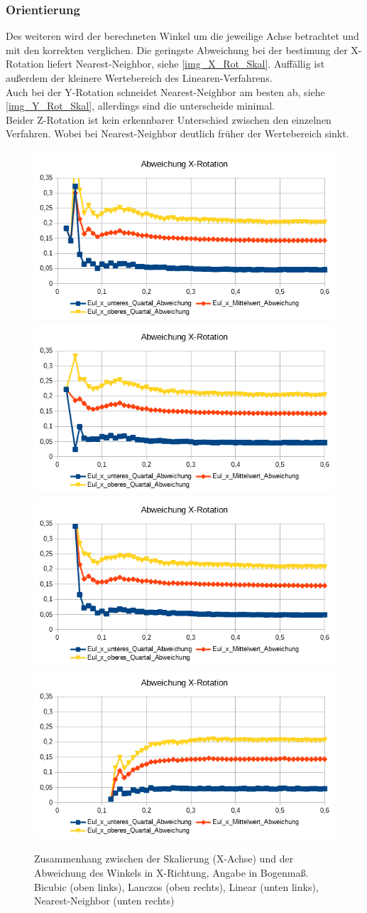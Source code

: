 \subsubsection{Orientierung}
Des weiteren wird der berechneten Winkel um die jeweilige Achse betrachtet und mit den korrekten verglichen. Die geringste Abweichung bei der bestimung der X-Rotation liefert Nearest-Neighbor, siehe \autoref{img_X_Rot_Skal}. Auffällig ist außerdem der kleinere Wertebereich des Linearen-Verfahrens.\\
Auch bei der Y-Rotation schneidet Nearest-Neighbor am besten ab, siehe \autoref{img_Y_Rot_Skal}, allerdings sind die unterscheide minimal.\\
Beider Z-Rotation ist kein erkennbarer Unterschied zwischen den einzelnen Verfahren. Wobei bei Nearest-Neighbor deutlich früher der Wertebereich sinkt.
\begin{figure}
	\centering
	\includegraphics[width=0.45\linewidth]{tabelle2/X_Rot_Cubic}
	\includegraphics[width=0.45\linewidth]{tabelle2/X_Rot_Lanc}
	\includegraphics[width=0.45\linewidth]{tabelle2/X_Rot_Linear}
	\includegraphics[width=0.45\linewidth]{tabelle2/X_Rot_NN}
	\caption{Zusammenhang zwischen der Skalierung (X-Achse) und der Abweichung des Winkels in X-Richtung, Angabe in Bogenmaß. 
		Bicubic (oben links), Lanczos (oben rechts), Linear (unten links), Nearest-Neighbor (unten rechts)}
	\label{img_X_Rot_Skal}
\end{figure}
